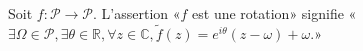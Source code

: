 Soit $f:\mathcal P\to \mathcal P$. L'assertion «$f$ est une rotation» signifie «$\exists \Omega\in\mathcal P, \exists \theta\in\mathbb R, \forall z\in\mathbb C, \tilde f(z)=e^{i\theta}(z-\omega)+\omega$.»

\begin{reponses}
\end{reponses}

